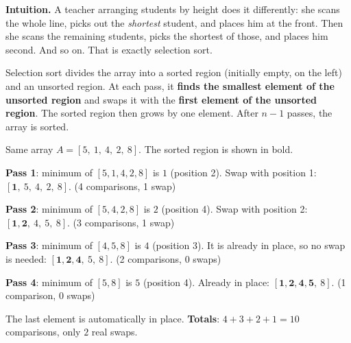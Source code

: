 \documentclass[11pt]{article}
\newcommand{\cle}[1]{{\popxbold\color{popdark}#1}}
\newcounter{popsec}
\newcounter{popsub}
\newcommand{\courssub}[1]{%
  \stepcounter{popsub}%
  \par\vspace{9pt}\noindent{\popxbold\fontsize{11.5}{13}\selectfont\color{popink}{\color{poporange}\thepopsec.\thepopsub}\hspace{6pt}#1}\par\nopagebreak\vspace{4pt}
}
\begin{document}
\courssub{Selection Sort}

\textbf{Intuition.} A teacher arranging students by height does it differently: she scans the whole line, picks out the \emph{shortest} student, and places him at the front. Then she scans the remaining students, picks the shortest of those, and places him second. And so on. That is exactly selection sort.

\begin{definition}
\cle{Selection sort} divides the array into a sorted region (initially empty, on the left) and an unsorted region. At each pass, it \textbf{finds the smallest element of the unsorted region} and swaps it with the \textbf{first element of the unsorted region}. The sorted region then grows by one element. After $n-1$ passes, the array is sorted.
\end{definition}

\begin{exemplebox}
Same array $A = [5,\ 1,\ 4,\ 2,\ 8]$. The sorted region is shown in bold.

\textbf{Pass 1}: minimum of $[5,1,4,2,8]$ is $1$ (position 2). Swap with position 1: $[\mathbf{1},\ 5,\ 4,\ 2,\ 8]$. (4 comparisons, 1 swap)

\textbf{Pass 2}: minimum of $[5,4,2,8]$ is $2$ (position 4). Swap with position 2: $[\mathbf{1, 2},\ 4,\ 5,\ 8]$. (3 comparisons, 1 swap)

\textbf{Pass 3}: minimum of $[4,5,8]$ is $4$ (position 3). It is already in place, so no swap is needed: $[\mathbf{1, 2, 4},\ 5,\ 8]$. (2 comparisons, 0 swaps)

\textbf{Pass 4}: minimum of $[5,8]$ is $5$ (position 4). Already in place: $[\mathbf{1, 2, 4, 5},\ 8]$. (1 comparison, 0 swaps)

The last element is automatically in place. \textbf{Totals}: $4+3+2+1 = 10$ comparisons, only $2$ real swaps.
\end{exemplebox}
\end{document}
